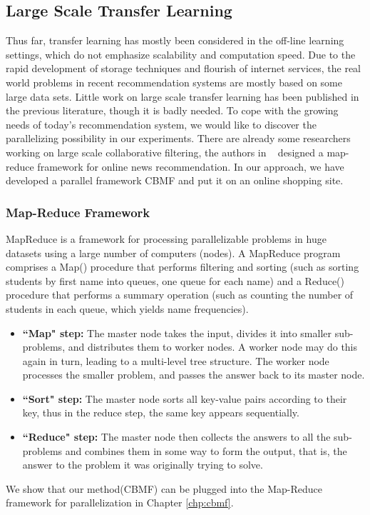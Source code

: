 \subsection{Large Scale Transfer Learning}
Thus far, transfer learning has mostly been considered in the off-line learning settings, which do not emphasize scalability and computation speed. Due to the rapid development of storage techniques and flourish of internet services, the real world problems in recent recommendation systems are mostly based on some large data sets. Little work on large scale transfer learning has been published in the previous literature, though it is badly needed. To cope with the growing needs of today’s recommendation system, we would like to discover the parallelizing possibility in our experiments. There are already some researchers working on large scale collaborative filtering, the authors in ~\cite{das2007google} designed a map-reduce framework for online news recommendation. In our approach, we have developed a parallel framework CBMF and put it on an online shopping site.
\hspace{0.02in}
\subsubsection{Map-Reduce Framework}
MapReduce is a framework for processing parallelizable problems in huge datasets using a large number of computers (nodes). A MapReduce program comprises a Map() procedure that performs filtering and sorting (such as sorting students by first name into queues, one queue for each name) and a Reduce() procedure that performs a summary operation (such as counting the number of students in each queue, which yields name frequencies).
\begin{itemize}
\item {\bf ``Map" step:} The master node takes the input, divides it into smaller sub-problems, and distributes them to worker nodes. A worker node may do this again in turn, leading to a multi-level tree structure. The worker node processes the smaller problem, and passes the answer back to its master node.
\item {\bf ``Sort" step:} The master node sorts all key-value pairs according to their key, thus in the reduce step, the same key appears sequentially.
\item {\bf ``Reduce" step:} The master node then collects the answers to all the sub-problems and combines them in some way to form the output, that is, the answer to the problem it was originally trying to solve.
\end{itemize}
We show that our method(CBMF) can be plugged into the Map-Reduce framework for parallelization in Chapter \ref{chp:cbmf}.




